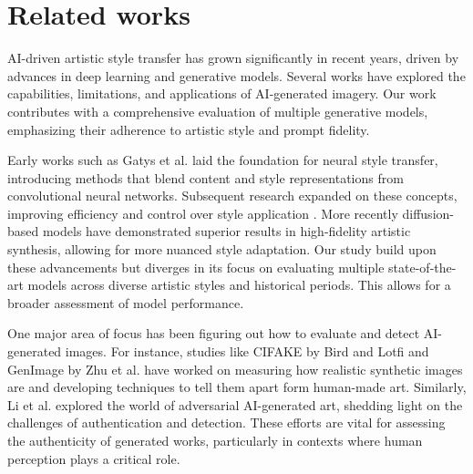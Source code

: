 \documentclass[sn-mathphys]{sn-jnl}
\begin{document}
\section{Related works}

AI-driven artistic style transfer has grown significantly in recent years, driven by advances in deep learning and generative models. Several works have explored the capabilities, limitations, and applications of AI-generated imagery. Our work contributes with a comprehensive evaluation of multiple generative models, emphasizing their adherence to artistic style and prompt fidelity.

Early works such as Gatys et al. \cite{Gatys_neural_representation} laid the foundation for neural style transfer, introducing methods that blend content and style representations from convolutional neural networks. Subsequent research expanded on these concepts, improving efficiency and control over style application \cite{Huang_style_transfer_normalization}. More recently diffusion-based models have demonstrated superior results in high-fidelity artistic synthesis, allowing for more nuanced style adaptation. Our study build upon these advancements but diverges in its focus on evaluating multiple state-of-the-art models across diverse artistic styles and historical periods. This allows for a broader assessment of model performance. 

One major area of focus has been figuring out how to evaluate and detect AI-generated images. For instance, studies like CIFAKE by Bird and Lotfi \cite{cifake} and GenImage by Zhu et al. \cite{genimage} have worked on measuring how realistic synthetic images are and developing techniques to tell them apart form human-made art. Similarly, Li et al. \cite{AIart} explored the world of adversarial AI-generated art, shedding light on the challenges of authentication and detection. These efforts are vital for assessing the authenticity of generated works, particularly in contexts where human perception plays a critical role. 
\end{document}
